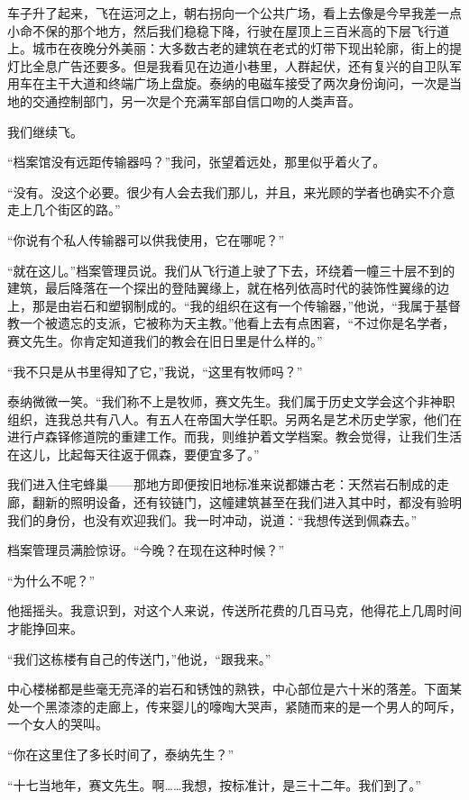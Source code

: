 \documentclass[AutoFakeBold=true]{book}
\begin{document}
车子升了起来，飞在运河之上，朝右拐向一个公共广场，看上去像是今早我差一点小命不保的那个地方，然后我们稳稳下降，行驶在屋顶上三百米高的下层飞行道上。城市在夜晚分外美丽：大多数古老的建筑在老式的灯带下现出轮廓，街上的提灯比全息广告还要多。但是我看见在边道小巷里，人群起伏，还有复兴的自卫队军用车在主干大道和终端广场上盘旋。泰纳的电磁车接受了两次身份询问，一次是当地的交通控制部门，另一次是个充满军部自信口吻的人类声音。

我们继续飞。

``档案馆没有远距传输器吗？''我问，张望着远处，那里似乎着火了。

``没有。没这个必要。很少有人会去我们那儿，并且，来光顾的学者也确实不介意走上几个街区的路。''

``你说有个私人传输器可以供我使用，它在哪呢？''

``就在这儿。''档案管理员说。我们从飞行道上驶了下去，环绕着一幢三十层不到的建筑，最后降落在一个探出的登陆翼缘上，就在格列依高时代的装饰性翼缘的边上，那是由岩石和塑钢制成的。``我的组织在这有一个传输器，''他说，``我属于基督教一个被遗忘的支派，它被称为天主教。''他看上去有点困窘，``不过你是名学者，赛文先生。你肯定知道我们的教会在旧日里是什么样的。''

``我不只是从书里得知了它，''我说，``这里有牧师吗？''

泰纳微微一笑。``我们称不上是牧师，赛文先生。我们属于历史文学会这个非神职组织，连我总共有八人。有五人在帝国大学任职。另两名是艺术历史学家，他们在进行卢森铎修道院的重建工作。而我，则维护着文学档案。教会觉得，让我们生活在这儿，比起每天往返于佩森，要便宜多了。''

我们进入住宅蜂巢——那地方即便按旧地标准来说都嫌古老：天然岩石制成的走廊，翻新的照明设备，还有铰链门，这幢建筑甚至在我们进入其中时，都没有验明我们的身份，也没有欢迎我们。我一时冲动，说道：``我想传送到佩森去。''

档案管理员满脸惊讶。``今晚？在现在这种时候？''

``为什么不呢？''

他摇摇头。我意识到，对这个人来说，传送所花费的几百马克，他得花上几周时间才能挣回来。

``我们这栋楼有自己的传送门，''他说，``跟我来。''

中心楼梯都是些毫无亮泽的岩石和锈蚀的熟铁，中心部位是六十米的落差。下面某处一个黑漆漆的走廊上，传来婴儿的嚎啕大哭声，紧随而来的是一个男人的呵斥，一个女人的哭叫。

``你在这里住了多长时间了，泰纳先生？''

``十七当地年，赛文先生。啊……我想，按标准计，是三十二年。我们到了。''
\end{document}
